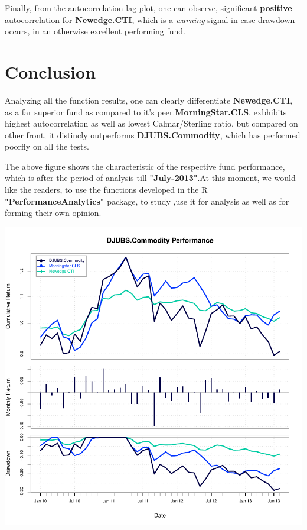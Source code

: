 \documentclass[12pt,letterpaper,english]{article}
\begin{document}
Finally, from the autocorrelation lag plot, one can observe, significant \textbf{positive} autocorrelation for \textbf{Newedge.CTI}, which is a \emph{warning} signal in case drawdown occurs, in an otherwise excellent performing fund.
\section{Conclusion}

Analyzing all the function results, one can clearly differentiate \textbf{Newedge.CTI}, as a far superior fund as compared to it's peer.\textbf{MorningStar.CLS}, exbhibits highest autocorrelation as well as lowest Calmar/Sterling ratio, but compared on other front, it distincly outperforms \textbf{DJUBS.Commodity}, which has performed poorfly on all the tests. 

The above figure shows the characteristic of the respective fund performance, which is after the period of analysis till \textbf{"July-2013"}.At this moment, we would like the readers, to use the functions developed in the R \textbf{"PerformanceAnalytics"} package, to study ,use it for analysis as well as for forming their own opinion. 

\includegraphics{CommodityReport-012}
\end{document}
